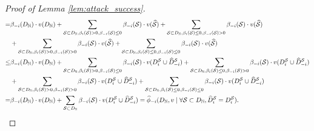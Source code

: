 \begin{proof}[Proof of Lemma \ref{lem:attack_success}]
\begin{align*}
		= & \beta_{-i}(D_{\mathbb{N}}) \cdot v(D_{\mathbb{N}}) + \sum_{\mathcal{S}\subset D_{\mathbb{N}}, \beta_i(\mathcal{S}) > 0, \beta_{-i}(\mathcal{S}) \leq 0} \beta_{-i}(\mathcal{S}) \cdot v(\widehat{\mathcal{S}}) + \sum_{\mathcal{S}\subset D_{\mathbb{N}}, \beta_i(\mathcal{S}) \leq 0, \beta_{-i}(\mathcal{S}) > 0} \beta_{-i}(\mathcal{S}) \cdot v(\widehat{\mathcal{S}}) \\
		& + \sum_{\mathcal{S}\subset D_{\mathbb{N}}, \beta_{i}(\mathcal{S}) > 0, \beta_{-i}(\mathcal{S}) > 0} \beta_{-i}(\mathcal{S}) \cdot v(\widehat{\mathcal{S}}) + \sum_{\mathcal{S}\subset D_{\mathbb{N}}, \beta_i(\mathcal{S}) \leq 0, \beta_{-i}(\mathcal{S}) \leq 0} \beta_{-i}(\mathcal{S}) \cdot v(\widehat{\mathcal{S}})\\
		\leq & \beta_{-i}(D_{\mathbb{N}}) \cdot v(D_{\mathbb{N}}) + \sum_{\mathcal{S}\subset D_{\mathbb{N}}, \beta_i(\mathcal{S}) > 0, \beta_{-i}(\mathcal{S}) \leq 0} \beta_{-i}(\mathcal{S}) \cdot v(D^{\mathcal{S}}_{i}\cup \widehat{D}^{\mathcal{S}}_{-i}) + \sum_{\mathcal{S}\subset D_{\mathbb{N}}, \beta_i(\mathcal{S}) \leq 0, \beta_{-i}(\mathcal{S}) > 0} \beta_{-i}(\mathcal{S}) \cdot v(D^{\mathcal{S}}_{i}\cup \widehat{D}^{\mathcal{S}}_{-i}) \\
		& + \sum_{\mathcal{S}\subset D_{\mathbb{N}}, \beta_i(\mathcal{S}) > 0, \beta_{-i}(\mathcal{S}) > 0} \beta_{-i}(\mathcal{S}) \cdot v(D^{\mathcal{S}}_{i}\cup \widehat{D}^{\mathcal{S}}_{-i}) + \sum_{\mathcal{S}\subset D_{\mathbb{N}}, \beta_i(\mathcal{S}) \leq 0, \beta_{-i}(\mathcal{S}) \leq 0} \beta_{-i}(\mathcal{S}) \cdot v(D^{\mathcal{S}}_{i}\cup \widehat{D}^{\mathcal{S}}_{-i})\\
		= & \beta_{-i}(D_{\mathbb{N}}) \cdot v(D_{\mathbb{N}}) + \sum_{\mathcal{S}\subset D_{\mathbb{N}}} \beta_{-i}(\mathcal{S}) \cdot v(D^{\mathcal{S}}_{i} \cup \widehat{D}^{\mathcal{S}}_{-i}) = \widehat{\phi}_{-i}(D_{\mathbb{N}}, v \mid \forall \mathcal{S} \subset D_{\mathbb{N}}, \widehat{D}^{\mathcal{S}}_{i} =  D^{\mathcal{S}}_{i}).
	\end{align*}
\end{proof}

